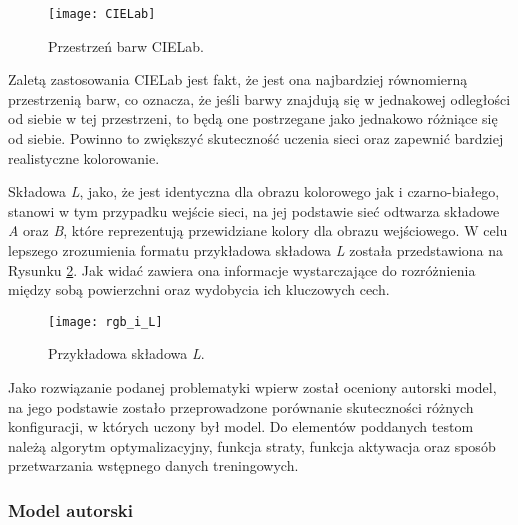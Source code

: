   \begin{figure}
    \centering
    \captionsetup{justification=centering}
    \texttt{[image: CIELab]}
    \caption[Przestrzeń barw CIELab - źródło:
    \url{https://www.flickr.com/photos/greenmambagreenmamba/4236391637}]
    {Przestrzeń barw CIELab.}
    \label{fig:CIELab}
  \end{figure}

  Zaletą zastosowania CIELab jest fakt, że jest ona najbardziej równomierną
  przestrzenią barw, co oznacza, że jeśli barwy znajdują się w jednakowej
  odległości od siebie w tej przestrzeni, to będą one postrzegane jako jednakowo
  różniące się od siebie. Powinno to zwiększyć skuteczność uczenia sieci oraz
  zapewnić bardziej realistyczne kolorowanie.

  Składowa \textit{L}, jako, że jest identyczna dla obrazu kolorowego jak i
  czarno-białego, stanowi w tym przypadku wejście sieci, na jej podstawie sieć
  odtwarza składowe \textit{A} oraz \textit{B}, które reprezentują przewidziane
  kolory dla obrazu wejściowego. W celu lepszego zrozumienia formatu przykładowa
  składowa \textit{L} została przedstawiona na Rysunku \ref{fig:przyklad_L}.
  Jak widać zawiera ona informacje wystarczające do rozróżnienia między sobą
  powierzchni oraz wydobycia ich kluczowych cech.

  \begin{figure}[ht]
    \centering
    \captionsetup{justification=centering}
    \texttt{[image: rgb\_i\_L]}
    \caption[Przykładowa składowa \textit{L} - źródło: Rysunek własny
    wykorzystujący:
    \url{https://fr.m.wikipedia.org/wiki/Fichier:An_F-A-18C_Hornet_launches_from_the_flight_deck_of_the_conventionally_powered_aircraft_carrier.jpg}]
    {Przykładowa składowa \textit{L}.}
    \label{fig:przyklad_L}
  \end{figure}

  Jako rozwiązanie podanej problematyki wpierw został oceniony autorski
  model, na jego podstawie zostało przeprowadzone porównanie skuteczności
  różnych konfiguracji, w których uczony był model. Do elementów poddanych
  testom należą algorytm optymalizacyjny, funkcja straty, funkcja aktywacja oraz
  sposób przetwarzania wstępnego danych treningowych.

\subsubsection{Model autorski} \label{model autorski}

